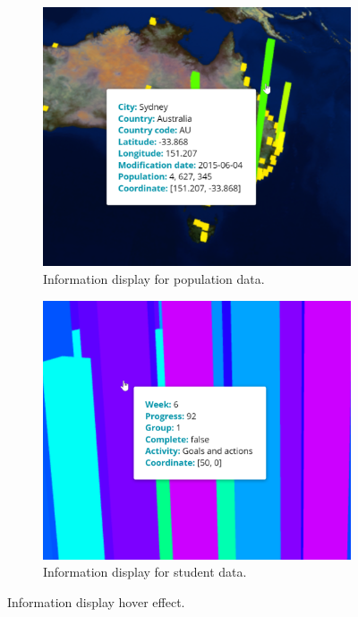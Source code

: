 
\begin{figure}[H]
	\centering
	\newcommand{\figurewidth}{0.4\textwidth}
	\begin{subfigure}[b]{\figurewidth}
		\centering
        \includegraphics[width=\textwidth]{images/implementation/information_display/population}
		\caption{Information display for population data.}
		\label{fig:information_display_population}
	\end{subfigure}
	\begin{subfigure}[b]{\figurewidth}
		\centering
		\includegraphics[width=\textwidth]{images/implementation/information_display/student}
		\caption{Information display for student data.}
		\label{fig:information_display_student}
	\end{subfigure}
	\caption[Information display]{Information display hover effect.}
	\label{fig:information_display}
\end{figure}

